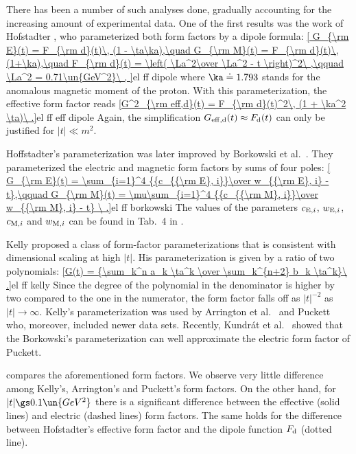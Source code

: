 There has been a number of such analyses done, gradually accounting for the increasing amount of experimental data. One of the first results was the work of Hofstadter , who parameterized both form factors by a dipole formula:
\eqref{
	G_{\rm E}(t) = F_{\rm d}(t)\, (1 - \ta\ka),\quad
	G_{\rm M}(t) = F_{\rm d}(t)\, (1+\ka),\quad
	F_{\rm d}(t) = \left( \La^2\over \La^2 - t \right)^2\ ,\qquad
	\La^2 = 0.71\un{GeV^2}\ ,
}{el ff dipole}
where $\ka\doteq 1.793$ stands for the anomalous magnetic moment of the proton. With this parameterization, the effective form factor reads
\eqref{G^2_{\rm eff,d}(t) = F_{\rm d}(t)^2\, (1 + \ka^2 \ta)\ .}{el ff eff dipole}
Again, the simplification $G_{\rm eff,d}(t)\approx F_{\rm d}(t)$ can only be justified for $|t| \ll m^2$.

Hoffstadter's parameterization was later improved by Borkowski et al.~. They parameterized the electric and magnetic form factors by sums of four poles:
\eqref{
G_{\rm E}(t) = \sum_{i=1}^4 {{c_{{\rm E}, i}}\over w_{{\rm E}, i} - t},\qquad
G_{\rm M}(t) = \mu\sum_{i=1}^4 {{c_{{\rm M}, i}}\over w_{{\rm M}, i} - t}
\ .}{el ff borkowski}
The values of the parameters $c_{{\rm E}, i}$, $w_{{\rm E}, i}$, $c_{{\rm M}, i}$ and $w_{{\rm M}, i}$ can be found in Tab.~4 in .

Kelly  proposed a class of form-factor parameterizations that is consistent with dimensional scaling at high $|t|$. His parameterization is given by a ratio of two polynomials:
\eqref{G(t) = {\sum_k^n a_k \ta^k \over \sum_k^{n+2} b_k \ta^k}\ .}{el ff kelly}
Since the degree of the polynomial in the denominator is higher by two compared to the one in the numerator, the form factor falls off as $|t|^{-2}$ as $|t|\to\infty$. Kelly's parameterization was used by Arrington et al.\  and Puckett  who, moreover, included newer data sets. Recently, Kundr\' at et al.~ showed that the Borkowski's parameterization can well approximate the electric form factor of Puckett.

 compares the aforementioned form factors. We observe very little difference among Kelly's, Arrington's and Puckett's form factors. On the other hand, for $|t| \gs 0.1\un{GeV^2}$ there is a significant difference between the effective (solid lines) and electric (dashed lines) form factors. The same holds for the difference between Hofstadter's effective form factor and the dipole function $F_{\rm d}$ (dotted line).


